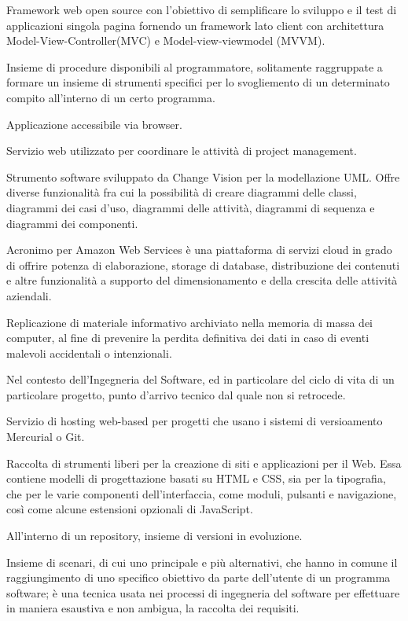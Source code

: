 \item[Angular.js] Framework web open source con l'obiettivo di semplificare lo sviluppo e il test di applicazioni singola pagina fornendo un framework lato client con architettura Model-View-Controller(MVC) e Model-view-viewmodel (MVVM).
\item[API] Insieme di procedure disponibili al programmatore, solitamente raggruppate a formare un insieme di strumenti specifici per lo svogliemento di un determinato compito all'interno di un certo programma.
\item[applicazione web] Applicazione accessibile via browser.
\item[Asana] Servizio web utilizzato per coordinare le attività di project management.
\item[Astah] Strumento software sviluppato da Change Vision per la modellazione UML. Offre diverse funzionalità fra cui la possibilità di creare diagrammi delle classi, diagrammi dei casi d’uso, diagrammi delle attività, diagrammi di sequenza e diagrammi dei componenti.
\item[AWS] Acronimo per Amazon Web Services è una piattaforma di servizi cloud in grado di offrire potenza di elaborazione, storage di database, distribuzione dei contenuti e altre funzionalità a supporto del dimensionamento e della crescita delle attività aziendali.
\item[backup] Replicazione di materiale informativo archiviato nella memoria di massa dei computer, al fine di prevenire la perdita definitiva dei dati in caso di eventi malevoli accidentali o intenzionali.
\item[baseline] Nel contesto dell'Ingegneria del Software, ed in particolare del ciclo di vita di un particolare progetto, punto d'arrivo tecnico dal quale non si retrocede.
\item[Bitbucket] Servizio di hosting web-based per progetti che usano i sistemi di versioamento Mercurial o Git.
\item[Bootstrap] Raccolta di strumenti liberi per la creazione di siti e applicazioni per il Web. Essa contiene modelli di progettazione basati su HTML e CSS, sia per la tipografia, che per le varie componenti dell'interfaccia, come moduli, pulsanti e navigazione, così come alcune estensioni opzionali di JavaScript.
\item[branch] All'interno di un repository, insieme di versioni in evoluzione.
\item[caso d'uso] Insieme di scenari, di cui uno principale e più alternativi, che hanno in comune il raggiungimento di uno specifico obiettivo da parte dell'utente di un programma software; è una tecnica usata nei processi di ingegneria del software per effettuare in maniera esaustiva e non ambigua, la raccolta dei requisiti.
